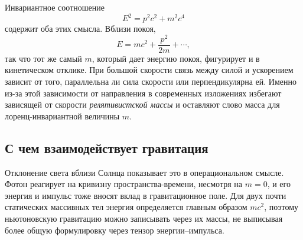 Инвариантное соотношение
\begin{equation}
  E^2=p^2c^2+m^2c^4
  \label{eq:l09-energy-momentum}
\end{equation}
содержит оба этих смысла. Вблизи покоя,
\begin{equation}
  E=mc^2+\frac{p^2}{2m}+\cdots,
\end{equation}
так что тот же самый \(m\), который дает энергию покоя, фигурирует и в кинетическом отклике. При большой скорости связь между силой и ускорением зависит от того, параллельна ли сила скорости или перпендикулярна ей. Именно из-за этой зависимости от направления в современных изложениях избегают зависящей от скорости \emph{релятивистской массы} и оставляют слово масса для лоренц-инвариантной величины \(m\).

\subsection{С чем взаимодействует гравитация}

\begin{classroomqa}
\end{classroomqa}

Отклонение света вблизи Солнца показывает это в операциональном смысле. Фотон реагирует на кривизну пространства-времени, несмотря на \(m=0\), и его энергия и импульс тоже вносят вклад в гравитационное поле. Для двух почти статических массивных тел энергия определяется главным образом \(mc^2\), поэтому ньютоновскую гравитацию можно записывать через их массы, не выписывая более общую формулировку через тензор энергии--импульса.

\begin{classroomqa}
\end{classroomqa}

